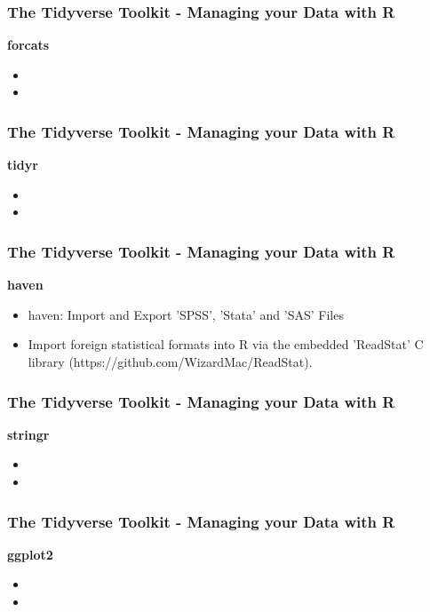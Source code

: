 \begin{frame}
\begin{frame}
\end{frame}
\begin{frame}
\frametitle{The Tidyverse Toolkit - Managing your Data with R}
\large

\textbf{forcats}
\begin{itemize}
\item


\item 
\end{itemize}

\end{frame}
\begin{frame}
\frametitle{The Tidyverse Toolkit - Managing your Data with R}
\large

\textbf{tidyr}
\begin{itemize}
\item


\item 
\end{itemize}

\end{frame}
\begin{frame}
\frametitle{The Tidyverse Toolkit - Managing your Data with R}
\large

\textbf{haven}
\begin{itemize}
\item haven: Import and Export 'SPSS', 'Stata' and 'SAS' Files

\item  Import foreign statistical formats into R via the embedded 'ReadStat' C library (https://github.com/WizardMac/ReadStat).

\end{itemize}
\end{frame}
\begin{frame}
\frametitle{The Tidyverse Toolkit - Managing your Data with R}
\large

\textbf{stringr}
\begin{itemize}
\item


\item 
\end{itemize}
\end{frame}
\begin{frame}
\frametitle{The Tidyverse Toolkit - Managing your Data with R}
\large

\textbf{ggplot2}
\begin{itemize}

\item

\item 

\end{itemize}
\end{frame}

